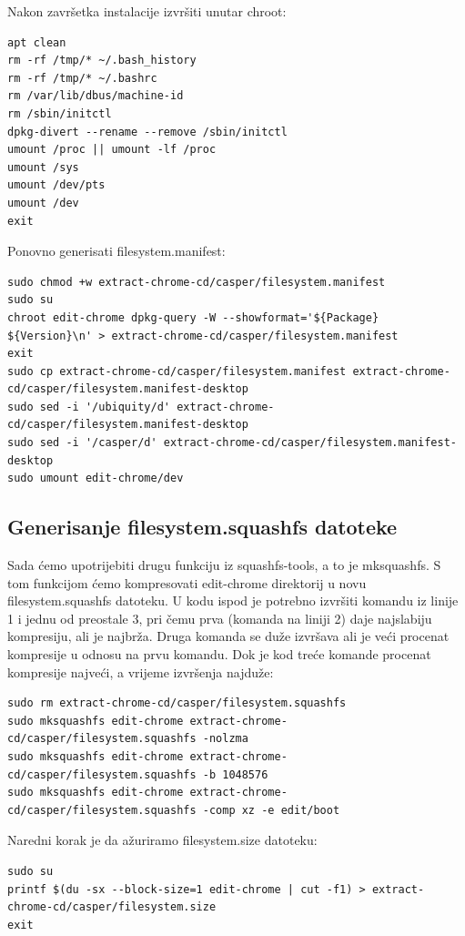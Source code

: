 \documentclass[12pt,vi]{mitthesis}
\begin{document}
\noindent
Nakon završetka instalacije izvršiti unutar chroot:
\begin{lstlisting}[style=BashInputStyle]
apt clean
rm -rf /tmp/* ~/.bash_history
rm -rf /tmp/* ~/.bashrc
rm /var/lib/dbus/machine-id
rm /sbin/initctl
dpkg-divert --rename --remove /sbin/initctl
umount /proc || umount -lf /proc
umount /sys
umount /dev/pts
umount /dev
exit
\end{lstlisting}

\noindent
Ponovno generisati filesystem.manifest:
\begin{lstlisting}[style=BashInputStyle]
sudo chmod +w extract-chrome-cd/casper/filesystem.manifest
sudo su
chroot edit-chrome dpkg-query -W --showformat='${Package} ${Version}\n' > extract-chrome-cd/casper/filesystem.manifest
exit
sudo cp extract-chrome-cd/casper/filesystem.manifest extract-chrome-cd/casper/filesystem.manifest-desktop
sudo sed -i '/ubiquity/d' extract-chrome-cd/casper/filesystem.manifest-desktop
sudo sed -i '/casper/d' extract-chrome-cd/casper/filesystem.manifest-desktop
sudo umount edit-chrome/dev
\end{lstlisting}

\subsection*{Generisanje filesystem.squashfs datoteke}
\noindent
Sada ćemo upotrijebiti drugu funkciju iz squashfs-tools, a to je mksquashfs. S tom funkcijom ćemo kompresovati edit-chrome direktorij u novu filesystem.squashfs datoteku. U kodu ispod je potrebno izvršiti komandu iz linije 1 i jednu od preostale 3, pri čemu prva (komanda na liniji 2) daje najslabiju kompresiju, ali je najbrža. Druga komanda se duže izvršava ali je veći procenat kompresije u odnosu na prvu komandu. Dok je kod treće komande procenat kompresije najveći, a vrijeme izvršenja najduže:
\begin{lstlisting}[style=BashInputStyle]
sudo rm extract-chrome-cd/casper/filesystem.squashfs
sudo mksquashfs edit-chrome extract-chrome-cd/casper/filesystem.squashfs -nolzma 
sudo mksquashfs edit-chrome extract-chrome-cd/casper/filesystem.squashfs -b 1048576
sudo mksquashfs edit-chrome extract-chrome-cd/casper/filesystem.squashfs -comp xz -e edit/boot
\end{lstlisting}

\noindent
Naredni korak je da ažuriramo filesystem.size datoteku:
\begin{lstlisting}[style=BashInputStyle]
sudo su
printf $(du -sx --block-size=1 edit-chrome | cut -f1) > extract-chrome-cd/casper/filesystem.size
exit
\end{lstlisting}
\end{document}
